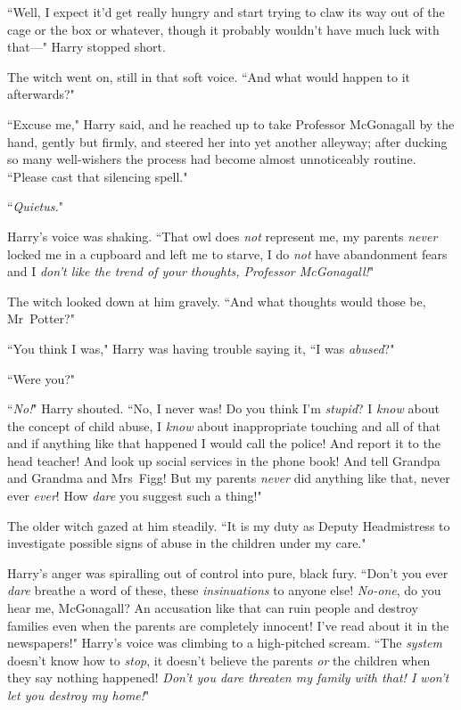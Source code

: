 ``Well, I expect it'd get really hungry and start trying to claw its way out of the cage or the box or whatever, though it probably wouldn't have much luck with that—" Harry stopped short.

The witch went on, still in that soft voice. ``And what would happen to it afterwards?"

``Excuse me," Harry said, and he reached up to take Professor McGonagall by the hand, gently but firmly, and steered her into yet another alleyway; after ducking so many well-wishers the process had become almost unnoticeably routine. ``Please cast that silencing spell."

``\emph{Quietus.}"

Harry's voice was shaking. ``That owl does \emph{not} represent me, my parents \emph{never} locked me in a cupboard and left me to starve, I do \emph{not} have abandonment fears and I \emph{don't like the trend of your thoughts, Professor McGonagall!}"

The witch looked down at him gravely. ``And what thoughts would those be, Mr~Potter?"

``You think I was," Harry was having trouble saying it, ``I was \emph{abused}?"

``Were you?"

``\emph{No!}" Harry shouted. ``No, I never was! Do you think I'm \emph{stupid}? I \emph{know} about the concept of child abuse, I \emph{know} about inappropriate touching and all of that and if anything like that happened I would call the police! And report it to the head teacher! And look up social services in the phone book! And tell Grandpa and Grandma and Mrs~Figg! But my parents \emph{never} did anything like that, never ever \emph{ever}! How \emph{dare} you suggest such a thing!"

The older witch gazed at him steadily. ``It is my duty as Deputy Headmistress to investigate possible signs of abuse in the children under my care."

Harry's anger was spiralling out of control into pure, black fury. ``Don't you ever \emph{dare} breathe a word of these, these \emph{insinuations} to anyone else! \emph{No-one}, do you hear me, McGonagall? An accusation like that can ruin people and destroy families even when the parents are completely innocent! I've read about it in the newspapers!" Harry's voice was climbing to a high-pitched scream. ``The \emph{system} doesn't know how to \emph{stop}, it doesn't believe the parents \emph{or} the children when they say nothing happened! \emph{Don't you dare threaten my family with that! I won't let you destroy my home!}"

